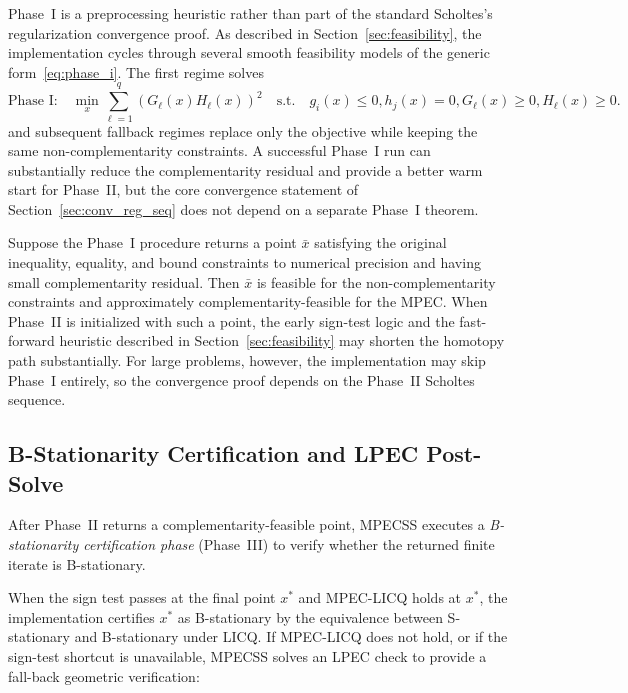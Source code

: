 Phase~I is a preprocessing heuristic rather than part of the standard
Scholtes's regularization convergence proof. As described in
Section~\ref{sec:feasibility}, the implementation cycles through
several smooth feasibility models of the generic
form~\eqref{eq:phase_i}. The first regime solves
\begin{equation}
  \text{Phase I:} \quad \min_{x} \sum_{\ell=1}^{q} (G_\ell(x) H_\ell(x))^2 \quad \text{s.t.} \quad g_i(x) \leq 0, h_j(x) = 0, G_\ell(x) \geq 0, H_\ell(x) \geq 0.
  \label{eq:phase_i_revisit}
\end{equation}
and subsequent fallback regimes replace only the objective while keeping
the same non-complementarity constraints. A successful Phase~I run can
substantially reduce the complementarity residual and provide a better
warm start for Phase~II, but the core convergence statement
of Section~\ref{sec:conv_reg_seq} does not depend on a separate
Phase~I theorem.

\begin{lemma}
\label{lem:phase_i_warm_start}
Suppose the Phase~I procedure returns a point $\bar{x}$ satisfying the
original inequality, equality, and bound constraints to numerical
precision and having small complementarity residual. Then $\bar{x}$ is
feasible for the non-complementarity constraints and approximately
complementarity-feasible for the MPEC. When Phase~II is initialized with
such a point, the early sign-test logic and the fast-forward heuristic
described in Section~\ref{sec:feasibility} may shorten the homotopy path
substantially. For large problems, however, the implementation may skip
Phase~I entirely, so the convergence proof depends on the Phase~II Scholtes sequence.
\end{lemma}




\subsection{B-Stationarity Certification and LPEC Post-Solve}
\label{sec:bstat_certification}

After Phase~II returns a complementarity-feasible point, MPECSS
executes a \emph{B-stationarity certification phase} (Phase~III) to
verify whether the returned finite iterate is B-stationary.

When the sign test passes at the final point $x^*$ and MPEC-LICQ
holds at $x^*$, the implementation certifies $x^*$ as B-stationary by
the equivalence between S-stationary and B-stationary under LICQ. If MPEC-LICQ
does not hold, or if the sign-test shortcut is unavailable, MPECSS
solves an LPEC check to provide a fall-back
geometric verification:

